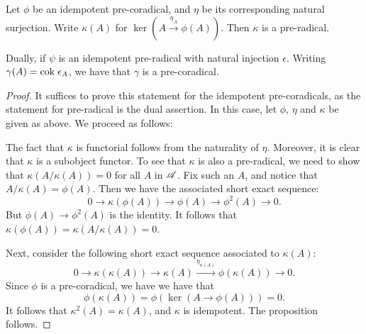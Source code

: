 \begin{prop}\label{prop_rad_eq_corad}
Let $\phi$ be an idempotent pre-coradical, and $\eta$ be its 
corresponding natural surjection. Write $\kappa(A)$ for $\ker (A 
\stackrel{\eta_A}{\to} \phi(A))$. Then $\kappa$ is a pre-radical.

Dually, if $\psi$ is an idempotent pre-radical with natural 
injection $\epsilon$. Writing $\gamma(A) = \mathrm{cok}\; \epsilon_A$, we 
have that $\gamma$ is a pre-coradical.
\end{prop}
\begin{proof}
It suffices to prove this statement for the idempotent 
pre-coradicals, as the statement for pre-radical is 
the dual assertion. In this case, let $\phi$, 
$\eta$ and $\kappa$ be given as above. We proceed as follows:

The fact that $\kappa$ is functorial follows from the naturality 
of $\eta$. Moreover, it is clear that $\kappa$ is a subobject 
functor. To see that $\kappa$ is also a pre-radical, we need to 
show that $\kappa(A/\kappa(A)) = 0$ for all $A$ in $\mathscr{A}$. Fix 
such an $A$, and notice that $A/\kappa(A) = \phi(A)$. Then we have 
the associated short exact sequence:
\[
0 \to \kappa(\phi(A)) \to \phi(A) \to \phi^2(A) \to 0.
\]
But $\phi(A) \to \phi^2(A)$ is the identity. It follows that 
$\kappa(\phi(A)) = \kappa(A/\kappa(A)) = 0$.

Next, consider the following short exact sequence associated to 
$\kappa(A)$:
\[
0 \to \kappa(\kappa(A)) \to \kappa(A) 
   \stackrel{\eta_{\kappa(A)}}{\to} \phi(\kappa(A)) \to 0.
\]
Since $\phi$ is a pre-coradical, we have we have that
\[
\phi(\kappa(A)) = \phi(\ker(A \to \phi(A))) = 0.
\]
It follows that $\kappa^2(A) = \kappa(A)$, and $\kappa$ is 
idempotent. The proposition follows.
\end{proof}

